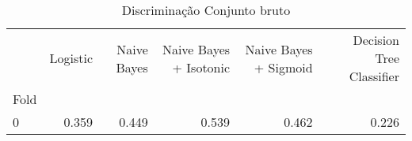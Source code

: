 \begin{table}
\centering
\caption{Discriminação Conjunto bruto}
\label{Discriminação Conjunto bruto 6}
\begin{tabular}{lrrrrr}
\toprule
{} &  Logistic &  Naive Bayes &  Naive Bayes + Isotonic &  Naive Bayes + Sigmoid &  Decision Tree Classifier \\
Fold &           &              &                         &                        &                           \\
\midrule
0    &     0.359 &        0.449 &                   0.539 &                  0.462 &                     0.226 \\
\bottomrule
\end{tabular}
\end{table}
